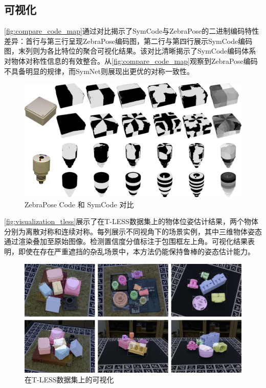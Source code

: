 \subsection{可视化} 

\autoref{fig:compare_code_map}通过对比揭示了SymCode与ZebraPose的二进制编码特性差异：首行与第三行呈现ZebraPose编码图，第二行与第四行展示SymCode编码图，末列则为各比特位的聚合可视化结果。该对比清晰揭示了SymCode编码体系对物体对称性信息的有效整合。从\autoref{fig:compare_code_map}观察到ZebraPose编码不具备明显的规律，而SymNet则展现出更优的对称一致性。

\begin{figure}[htbp]
        \centerline{\includegraphics[width=1.0\textwidth]{figure/symnet/compare_code_map.jpg}}
        \caption{ZebraPose Code 和 SymCode 对比}
        \label{fig:compare_code_map}
\end{figure}

\autoref{fig:visualization_tless}展示了在T-LESS数据集上的物体位姿估计结果，两个物体分别为离散对称和连续对称。每列展示不同视角下的场景实例，其中三维物体姿态通过渲染叠加至原始图像。检测置信度分值标注于包围框左上角。可视化结果表明，即使在存在严重遮挡的杂乱场景中，本方法仍能保持鲁棒的姿态估计能力。

\begin{figure}[htbp]
        \centerline{\includegraphics[width=1.0\textwidth]{figure/symnet/visualization_tless.jpg}}
        \caption{在T-LESS数据集上的可视化}
        \label{fig:visualization_tless}
\end{figure}

